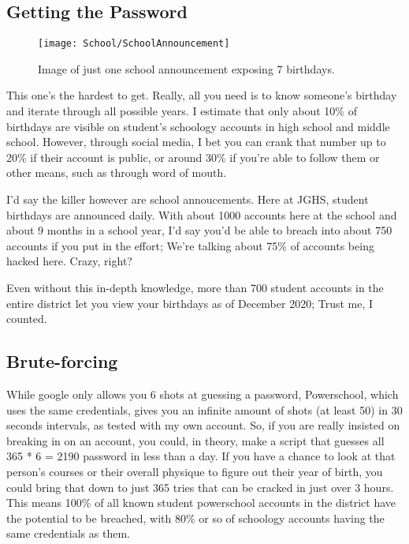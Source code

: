 \subsection{Getting the Password}

\begin{figure}[h]
    \centering
    \texttt{[image: School/SchoolAnnouncement]}
    \caption{
        Image of just one school announcement exposing 7 birthdays.
    }
\end{figure}


This one's the hardest to get. Really, all you need is to know someone's birthday and iterate through all possible years. I estimate that only about 10\% of birthdays are visible on student's schoology accounts in high school and middle school. However, through social media, I bet you can crank that number up to 20\% if their account is public, or around 30\% if you're able to follow them or other means, such as through word of mouth.

I'd say the killer however are school annoucements. Here at JGHS, student birthdays are announced daily. With about 1000 accounts here at the school and about 9 months in a school year, I'd say you'd be able to breach into about 750 accounts if you put in the effort; We're talking about 75\% of accounts being hacked here. Crazy, right?

Even without this in-depth knowledge, more than 700 student accounts in the entire district let you view your birthdays as of December 2020; Trust me, I counted.

\subsection{Brute-forcing}

While google only allows you 6 shots at guessing a password, Powerschool, which uses the same credentials, gives you an infinite amount of shots (at least 50) in 30 seconds intervals, as tested with my own account. So, if you are really insisted on breaking in on an account, you could, in theory, make a script that guesses all 365 * 6 = 2190 password in less than a day. If you have a chance to look at that person's courses or their overall physique to figure out their year of birth, you could bring that down to just 365 tries that can be cracked in just over 3 hours. This means 100\% of all known student powerschool accounts in the district have the potential to be breached, with 80\% or so of schoology accounts having the same credentials as them.

